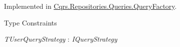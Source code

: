 Implemented in \hyperlink{classCqrs_1_1Repositories_1_1Queries_1_1QueryFactory_aefca41f8cab3f333984b782e7c87f3d1_aefca41f8cab3f333984b782e7c87f3d1}{Cqrs.\+Repositories.\+Queries.\+Query\+Factory}.

\begin{Desc}
\item[Type Constraints]\begin{description}
\item[{\em T\+User\+Query\+Strategy} : {\em I\+Query\+Strategy}]\end{description}
\end{Desc}
